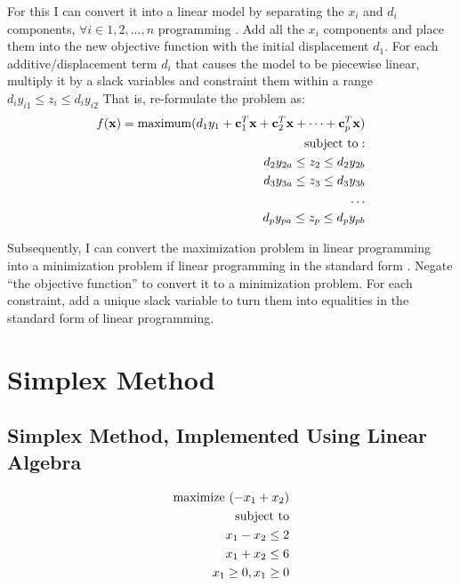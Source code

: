 \documentclass[letter,12pt]{article}
\begin{document}
For this I can convert it into a linear model by separating the $x_{i}$ and $d_{i}$ components, $\forall i \in {1, 2, ..., n}$
programming \cite[\S3.3, pages 83--86]{Haftka1992}\cite[\S1, pages 5-8]{Malucelli2005}. Add all the $x_{i}$ components and place them into the new objective function with the initial displacement $d_{1}$. For each additive/displacement term $d_{i}$ that causes the model to be piecewise linear, multiply it by a slack variables and constraint them within a range $d_{i}y_{i1} \leq z_{i} \leq d_{i}y_{i2}$ That is, re-formulate the problem as:
\begin{eqnarray*}
f({\mathbf{x}}) = {\rm maximum} (d_{1}y_{1} + \mathbf{c}^{T}_{1}\mathbf{x} + \mathbf{c}^{T}_{2}\mathbf{x} + \dots + \mathbf{c}^{T}_{p}\mathbf{x}) \\
{\rm subject\ to:} \\
d_{2}y_{2a} \leq z_{2} \leq d_{2}y_{2b} \\
d_{3}y_{3a} \leq z_{3} \leq d_{3}y_{3b} \\
\dots \\
d_{p}y_{pa} \leq z_{p} \leq d_{p}y_{pb} \\
\end{eqnarray*}


Subsequently, I can convert the maximization problem in linear programming into a minimization problem if linear programming in the standard form \cite[\S3.4, page 48, Example 1]{Luenberger2008}. Negate ``the objective function'' to convert it to a minimization problem. For each constraint, add a unique slack variable to turn them into equalities in the standard form of linear programming.

\section{Simplex Method}
\label{ssec:simplexmethod}



\subsection{Simplex Method, Implemented Using Linear Algebra}
\label{ssec:simplexmethodlinearalgebra}

\begin{eqnarray*}
{\rm maximize}\ (-x_{1} + x_{2}) \\
{\rm subject\ to} \\
x_{1} - x_{2} \leq 2 \\
x_{1} + x_{2} \leq 6 \\
x_{1} \geq 0, x_{1} \geq 0 \\
\end{eqnarray*}
\end{document}

